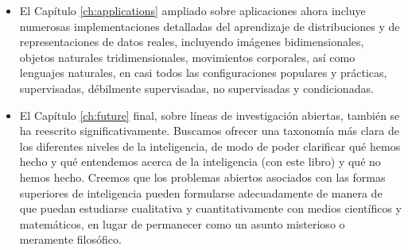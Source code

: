 \documentclass[../../book-main_es.tex]{subfiles}
\begin{document}
\begin{itemize}
        añadido una sección que ofrece una explicación basada en principios
        del aprendizaje de representaciones con datos pareados y generación 
        condicionada a través de la perspectiva de la información mutua. Proporciona
        una justificación teórica para métodos populares y prácticos tales como
        CLIP y formas de atención cruzada.
    \item El Capítulo \ref{ch:applications} ampliado sobre aplicaciones ahora
        incluye numerosas implementaciones detalladas del aprendizaje de
        distribuciones y de representaciones de datos reales,
        incluyendo imágenes bidimensionales, objetos naturales tridimensionales, 
        movimientos corporales, así como lenguajes naturales, en
        casi todos las configuraciones populares y prácticas, supervisadas, débilmente 
        supervisadas, no supervisadas y condicionadas.
    \item El Capítulo \ref{ch:future} final, sobre líneas de 
        investigación abiertas, también se ha reescrito significativamente.
        Buscamos ofrecer una taxonomía más clara de los diferentes niveles
        de la inteligencia, de modo de poder clarificar qué hemos hecho y qué
        entendemos acerca de la inteligencia (con este libro) y qué no hemos hecho. Creemos
        que los problemas abiertos asociados con las formas superiores de
        inteligencia pueden formularse adecuadamente de manera de que puedan 
        estudiarse cualitativa y cuantitativamente con medios
        científicos y matemáticos, en lugar de permanecer como un asunto
        misterioso o meramente filosófico.
\end{itemize}
\end{document}
